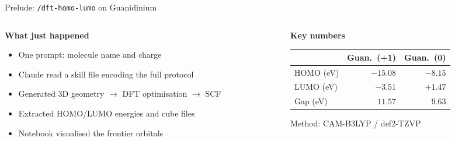 \documentclass[aspectratio=169, 10pt]{beamer}
\begin{document}
\begin{frame}{Prelude: \texttt{/dft-homo-lumo} on Guanidinium}
  \begin{columns}[T]
    \begin{column}{0.50\textwidth}
      \textbf{\color{biokteal}What just happened}
      \begin{itemize}[label=\textbullet]\setlength\itemsep{4pt}
        \item One prompt: molecule name and charge
        \item Claude read a skill file encoding the full protocol
        \item Generated 3D geometry $\to$ DFT optimisation $\to$ SCF
        \item Extracted HOMO/LUMO energies and cube files
        \item Notebook visualised the frontier orbitals
      \end{itemize}
    \end{column}
    \begin{column}{0.46\textwidth}
      \textbf{\color{biokteal}Key numbers}
      \renewcommand{\arraystretch}{1.3}
      \begin{tabular}{@{}lrr@{}}
        \toprule
        & \textbf{Guan.\ (+1)} & \textbf{Guan.\ (0)} \\
        \midrule
        HOMO (eV) & $-15.08$ & $-8.15$ \\
        LUMO (eV) & $-3.51$  & $+1.47$ \\
        Gap (eV)  & $11.57$  & $9.63$  \\
        \bottomrule
      \end{tabular}
      \vspace{0.5em}
      \begin{block}{}
        \small Method: CAM-B3LYP / def2-TZVP
      \end{block}
    \end{column}
  \end{columns}
\end{frame}
\end{document}
